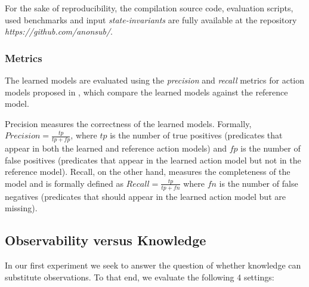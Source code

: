 \documentclass{article}
\begin{document}

For the sake of reproducibility, the compilation source code, evaluation scripts, used benchmarks and input {\em state-invariants} are fully available at the repository {\em https://github.com/anonsub/}.

\subsubsection{Metrics}
The learned models are evaluated using the {\em precision} and {\em recall} metrics for action models proposed in \cite{aineto2018learning}, which compare the learned models against the reference model.

Precision measures the correctness of the learned models. Formally, $Precision=\frac{tp}{tp+fp}$, where $tp$ is the number of true positives (predicates that appear in both the learned and reference action models) and $fp$ is the number of false positives (predicates that appear in the learned action model but not in the reference model). Recall, on the other hand, measures the completeness of the model and is formally defined as $Recall=\frac{tp}{tp+fn}$ where $fn$ is the number of false negatives (predicates that should appear in the learned action model but are missing).



\subsection{Observability versus Knowledge}
In our first experiment we seek to answer the question of whether knowledge can substitute observations. To that end, we evaluate the following 4 settings:
\end{document}
